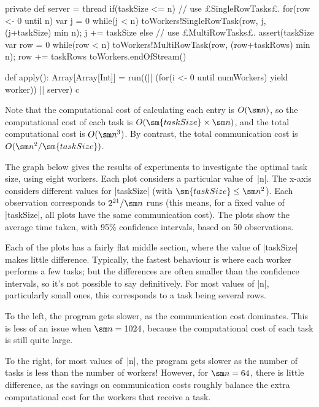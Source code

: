 \begin{answerI}
\begin{scala}
{  private def server = thread{
    if(taskSize <= n){ // use £SingleRowTasks£.
      for(row <- 0 until n){
        var j = 0
        while(j < n){ 
          toWorkers!SingleRowTask(row, j, (j+taskSize) min n); j += taskSize
        }
      }
    }
    else{ // use £MultiRowTasks£.
      assert(taskSize%
      var row = 0
      while(row < n){
        toWorkers!MultiRowTask(row, (row+taskRows) min n); row += taskRows
      }
    }
    toWorkers.endOfStream()
  }

  def apply(): Array[Array[Int]] = {
    run((|| (for(i <- 0 until numWorkers) yield worker)) || server)
    c
  }
}
\end{scala}


Note that the computational cost of calculating each entry is $O(\sm n)$, so
the computational cost of each task is $O(\sm{taskSize} \times \sm n)$, and
the total computational cost is $O(\sm n^3)$.  By contrast, the total
communication cost is $O(\sm n^2 / \sm{taskSize})$.

The graph below gives the results of experiments to investigate the optimal
task size, using eight workers.  Each plot considers a particular value
of~|n|.  The x-axis considers different values for |taskSize| (with
$\sm{taskSize} \le \sm n^2$).  Each observation corresponds to $2^{21}/\sm n$
runs (this means, for a fixed value of |taskSize|, all plots have the same
communication cost).  The plots show the average time taken, with 95\%
confidence intervals, based on 50 observations.

\begin{center}

\end{center}

Each of the plots has a fairly flat middle section, where the value of
|taskSize| makes little difference.  Typically, the fastest behaviour is where
each worker performs a few tasks; but the differences are often smaller than
the confidence intervals, so it's not possible to say definitively.  For most 
values of |n|, particularly small ones, this corresponds to a task being
several rows. 

To the left, the program gets slower, as the communication cost dominates.
This is less of an issue when $\sm n = 1024$, because the computational cost
of each task is still quite large.

To the right, for most values of~|n|, the program gets slower as the number of
tasks is less than the number of workers!  However, for $\sm n = 64$, there is
little difference, as the savings on communication costs roughly balance the
extra computational cost for the workers that receive a task. 
\end{answerI}

